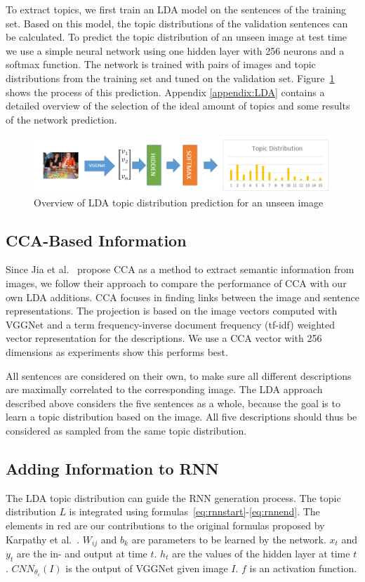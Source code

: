 \documentclass[twoside,twocolumn]{article}
\begin{document}
	To extract topics, we first train an LDA model on the sentences of the training set. Based on this model, the topic distributions of the validation sentences can be calculated. To predict the topic distribution of an unseen image at test time we use a simple neural network using one hidden layer with 256 neurons and a softmax function. The network is trained with pairs of images and topic distributions from the training set and tuned on the validation set. Figure~\ref{fig:ldaprocess} shows the process of this prediction. Appendix \ref{appendix:LDA} contains a detailed overview of the selection of the ideal amount of topics and some results of the network prediction. 
	
	\begin{figure}
		\centering
		\includegraphics[width=\textwidth]{LDANetwerktranslate.png}
		\caption{Overview of LDA topic distribution prediction for an unseen image}
		\label{fig:ldaprocess}
	\end{figure}
	
	\subsection{CCA-Based Information}
	Since Jia et al.~\cite{Fernando2015} propose CCA as a method to extract semantic information from images, we follow their approach to compare the performance of CCA with our own LDA additions. CCA focuses in finding links between the image and sentence representations. The projection is based on the image vectors computed with VGGNet and a term frequency-inverse document frequency (tf-idf) weighted vector representation for the descriptions. We use a CCA vector with 256 dimensions as experiments show this performs best. 
	
	All sentences are considered on their own, to make sure all different descriptions are maximally correlated to the corresponding image. The LDA approach described above considers the five sentences as a whole, because the goal is to learn a topic distribution based on the image. All five descriptions should thus be considered as sampled from the same topic distribution.
	
	
	\subsection{Adding Information to RNN}
	The LDA topic distribution can guide the RNN generation process. The topic distribution $L$ is integrated using formulas~\eqref{eq:rnnstart}-\eqref{eq:rnnend}. The elements in red are our contributions to the original formulas proposed by Karpathy et al.~\cite{Karpathy2015}. $W_{ij}$ and $b_k$ are parameters to be learned by the network. $x_t$ and $y_t$ are the in- and output at time $t$. $h_t$ are the values of the hidden layer at time $t$. $CNN_{\theta_c}(I)$ is the output of VGGNet given image $I$. $f$ is an activation function.
	
\end{document}

